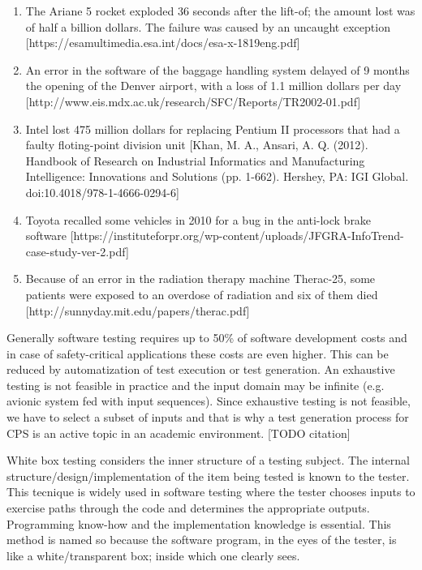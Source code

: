 \begin{enumerate}
	\item The Ariane 5 rocket exploded 36 seconds after the lift-of; the amount lost was of half a billion dollars. The failure was caused by an uncaught exception [https://esamultimedia.esa.int/docs/esa-x-1819eng.pdf]
	\item An error in the software of the baggage handling system delayed of 9 months the opening of the Denver airport, with a loss of 1.1 million dollars per day [http://www.eis.mdx.ac.uk/research/SFC/Reports/TR2002-01.pdf]
	\item Intel lost 475 million dollars for replacing Pentium II processors that had a faulty floting-point division unit [Khan, M. A., Ansari, A. Q. (2012). Handbook of Research on Industrial Informatics and Manufacturing Intelligence: Innovations and Solutions (pp. 1-662). Hershey, PA: IGI Global. doi:10.4018/978-1-4666-0294-6]
	\item Toyota recalled some vehicles in 2010 for a bug in the anti-lock brake software [https://instituteforpr.org/wp-content/uploads/JFGRA-InfoTrend-case-study-ver-2.pdf]
	\item Because of an error in the radiation therapy machine Therac-25, some patients were exposed to an overdose of radiation and six of them died [http://sunnyday.mit.edu/papers/therac.pdf]
\end{enumerate}

Generally software testing requires up to 50\% of software development costs and in case of safety-critical applications these costs are even higher. This can be reduced by automatization of test execution or test generation. An exhaustive testing is not feasible in practice and the input domain may be infinite (e.g. avionic system fed with input sequences). Since exhaustive testing is not feasible, we have to select a subset of inputs and that is why a test generation process for CPS is an active topic in an academic environment. [TODO citation]

White box testing considers the inner structure of a testing subject. The internal structure/design/implementation of the item being tested is known to the tester. This tecnique is widely used in software testing where the tester chooses inputs to exercise paths through the code and determines the appropriate outputs. Programming know-how and the implementation knowledge is essential. This method is named so because the software program, in the eyes of the tester, is like a white/transparent box; inside which one clearly sees.

